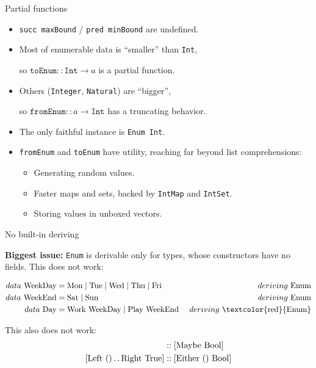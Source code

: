 \documentclass[handout]{beamer}
\def\dd{\,.\,.\,}
\begin{document}
\begin{frame}{Partial functions}

\begin{itemize}[<+->]

\item {\tt succ maxBound} / {\tt pred minBound} are undefined.

\bigskip

\item Most of enumerable data is ``smaller'' than {\tt Int},
      \par so $ \texttt{toEnum} :: \texttt{Int} \to a $ is a partial function.
\item Others ({\tt Integer}, {\tt Natural}) are ``bigger'',
      \par so $ \texttt{fromEnum} :: a \to \texttt{Int} $ has a truncating behavior.
\item The only faithful instance is {\tt Enum Int}.

\bigskip

\item
{\tt fromEnum} and {\tt toEnum} have utility, reaching far beyond
list comprehensions:

\begin{itemize}[<+->]
  \item Generating random values.
  \item Faster maps and sets, backed by {\tt IntMap} and {\tt IntSet}.
  \item Storing values in unboxed vectors.
\end{itemize}

\end{itemize}
\end{frame}

\begin{frame}{No built-in deriving}

{\bf Biggest issue:} {\tt Enum} is derivable only for types,
      whose constructors have no fields. This does not work:

\begin{align*}
data~ \text{WeekDay} &= \text{Mon} \mid \text{Tue} \mid \text{Wed} \mid \text{Thu} \mid \text{Fri} &{~deriving~} \text{Enum} \\
data~ \text{WeekEnd} &= \text{Sat} \mid \text{Sun} &{~deriving~} \text{Enum} \\
data~ \text{Day} &= \text{Work~WeekDay} \mid \text{Play WeekEnd} &{~deriving~} \text{\textcolor{red}{Enum}}
\end{align*}

\pause

This also does not work:
\begin{align*}
[ {\rm Nothing} \dd {\rm Just~True} ] &:: [{\rm Maybe~Bool}] \\
[ {\rm Left~}() \dd {\rm Right~True} ] &:: [{\rm Either~()~Bool}]
\end{align*}

\end{frame}
\end{document}
